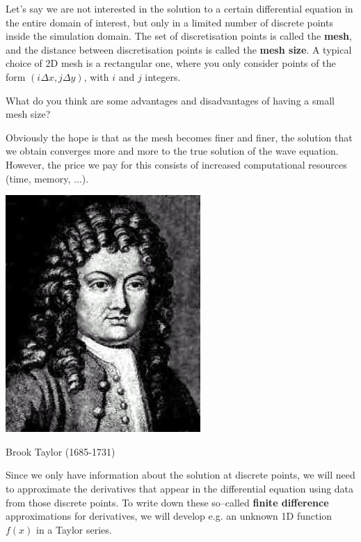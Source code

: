 \pagebreak


Let's say we are not interested in the solution to a certain differential equation in the entire domain of interest, but only in a limited number of discrete points inside the simulation domain. The set of discretisation points is called the \textbf{mesh}, and the distance between discretisation points is called the \textbf{mesh size}. A typical choice of 2D mesh is a rectangular one, where you only consider points of the form $(i \Delta x, j \Delta y)$, with $i$ and $j$ integers.

\begin{cue}
What do you think are some advantages and disadvantages of having a small mesh size?  
\end{cue}

Obviously the hope is that as the mesh becomes finer and finer, the solution that we obtain converges more and more to the true solution of the wave equation. However, the price we pay for this consists of increased computational resources (time, memory, ...).

\begin{marginfigure}[-2.0cm]
  \includegraphics{numeric/figures/b_taylor}
  \caption{Brook Taylor (1685-1731)}
\end{marginfigure}

Since we only have information about the solution at discrete points, we will need to approximate the derivatives that appear in the differential equation using data from those discrete points. To write down these so--called \textbf{finite difference} approximations for derivatives, we will develop e.g. an unknown 1D function $f(x)$ in a Taylor series.

